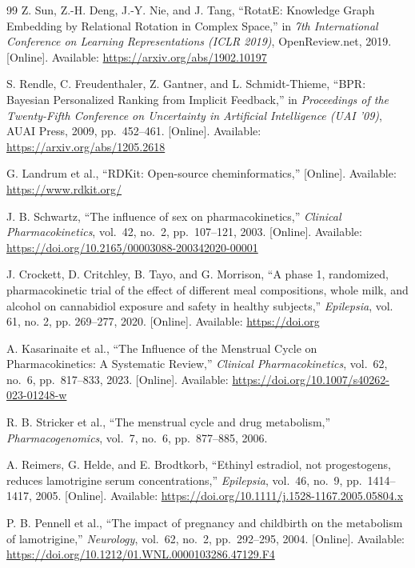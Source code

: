 \begin{thebibliography}{99}
Z. Sun, Z.-H. Deng, J.-Y. Nie, and J. Tang,
``RotatE: Knowledge Graph Embedding by Relational Rotation in Complex Space,''
in \textit{7th International Conference on Learning Representations (ICLR 2019)},
OpenReview.net, 2019.
[Online]. Available: \url{https://arxiv.org/abs/1902.10197}

S. Rendle, C. Freudenthaler, Z. Gantner, and L. Schmidt-Thieme,
``BPR: Bayesian Personalized Ranking from Implicit Feedback,''
in \textit{Proceedings of the Twenty-Fifth Conference on Uncertainty in Artificial Intelligence (UAI '09)},
AUAI Press, 2009, pp.~452--461.
[Online]. Available: \url{https://arxiv.org/abs/1205.2618}

G. Landrum et al.,
``RDKit: Open-source cheminformatics,''
[Online]. Available: \url{https://www.rdkit.org/}

J. B. Schwartz,
``The influence of sex on pharmacokinetics,''
\textit{Clinical Pharmacokinetics}, vol.~42, no.~2, pp.~107--121, 2003.
[Online]. Available: \url{https://doi.org/10.2165/00003088-200342020-00001}

J. Crockett, D. Critchley, B. Tayo, and G. Morrison,
``A phase 1, randomized, pharmacokinetic trial of the effect of different meal compositions, whole milk, and alcohol on cannabidiol exposure and safety in healthy subjects,''
\textit{Epilepsia}, vol. 61, no. 2, pp. 269--277, 2020.
[Online]. Available: \url{https://doi.org}

A. Kasarinaite et al.,
``The Influence of the Menstrual Cycle on Pharmacokinetics: A Systematic Review,''
\textit{Clinical Pharmacokinetics}, vol.~62, no.~6, pp.~817--833, 2023.
[Online]. Available: \url{https://doi.org/10.1007/s40262-023-01248-w}

R. B. Stricker et al.,
``The menstrual cycle and drug metabolism,''
\textit{Pharmacogenomics}, vol.~7, no.~6, pp.~877--885, 2006.

A. Reimers, G. Helde, and E. Brodtkorb,
``Ethinyl estradiol, not progestogens, reduces lamotrigine serum concentrations,''
\textit{Epilepsia}, vol.~46, no.~9, pp.~1414--1417, 2005.
[Online]. Available: \url{https://doi.org/10.1111/j.1528-1167.2005.05804.x}

P. B. Pennell et al.,
``The impact of pregnancy and childbirth on the metabolism of lamotrigine,''
\textit{Neurology}, vol.~62, no.~2, pp.~292--295, 2004.
[Online]. Available: \url{https://doi.org/10.1212/01.WNL.0000103286.47129.F4}


\end{thebibliography}

